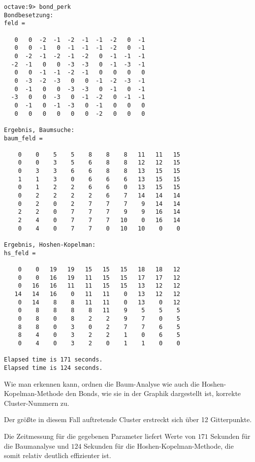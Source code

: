 \begin{lstlisting}[caption=Ausgabe von \lref{bond_perk},label=lst:output]
octave:9> bond_perk
Bondbesetzung:
feld =

   0   0  -2  -1  -2  -1  -1  -2   0  -1
   0   0  -1   0  -1  -1  -1  -2   0  -1
   0  -2  -1  -2  -1  -2   0  -1  -1  -1
  -2  -1   0   0  -3  -3   0  -1  -3  -1
   0   0  -1  -1  -2  -1   0   0   0   0
   0  -3  -2  -3   0   0  -1  -2  -3  -1
   0  -1   0   0  -3  -3   0  -1   0  -1
  -3   0   0  -3   0  -1  -2   0  -1  -1
   0  -1   0  -1  -3   0  -1   0   0   0
   0   0   0   0   0   0  -2   0   0   0

Ergebnis, Baumsuche:
baum_feld =

    0    0    5    5    8    8    8   11   11   15
    0    0    3    5    6    8    8   12   12   15
    0    3    3    6    6    8    8   13   15   15
    1    1    3    0    6    6    6   13   15   15
    0    1    2    2    6    6    0   13   15   15
    0    2    2    2    2    6    7   14   14   14
    0    2    0    2    7    7    7    9   14   14
    2    2    0    7    7    7    9    9   16   14
    2    4    0    7    7    7   10    0   16   14
    0    4    0    7    7    0   10   10    0    0

Ergebnis, Hoshen-Kopelman:
hs_feld =

    0    0   19   19   15   15   15   18   18   12
    0    0   16   19   11   15   15   17   17   12
    0   16   16   11   11   15   15   13   12   12
   14   14   16    0   11   11    0   13   12   12
    0   14    8    8   11   11    0   13    0   12
    0    8    8    8    8   11    9    5    5    5
    0    8    0    8    2    2    9    7    0    5
    8    8    0    3    0    2    7    7    6    5
    8    4    0    3    2    2    1    0    6    5
    0    4    0    3    2    0    1    1    0    0

Elapsed time is 171 seconds.
Elapsed time is 124 seconds.
\end{lstlisting}

Wie man erkennen kann, ordnen die Baum-Analyse wie auch die Hoshen-Kopelman-Methode den Bonds, wie sie in der Graphik dargestellt
ist, korrekte Cluster-Nummern zu.

Der größte in diesem Fall auftretende Cluster erstreckt sich über 12 Gitterpunkte.

Die Zeitmessung für die gegebenen Parameter liefert Werte von $171$ Sekunden für die
Baumanalyse und $124$ Sekunden für die Hoshen-Kopelman-Methode, die somit relativ deutlich
effizienter ist.